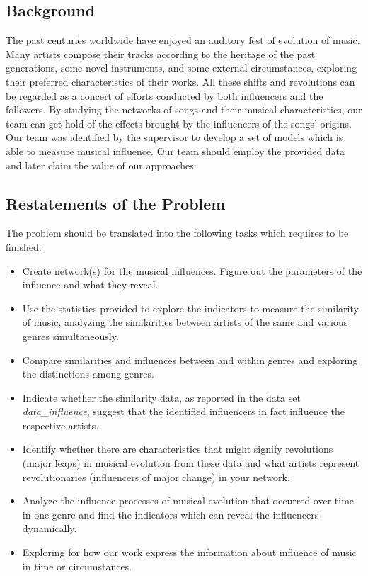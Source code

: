 \documentclass[12pt]{article}
\begin{document}
\subsection{Background}
The past centuries worldwide have enjoyed an auditory fest of evolution of music. Many artists compose their tracks according to the heritage of the past generations, some novel instruments, and some external circumstances, exploring their preferred characteristics of their works. All these shifts and revolutions can be regarded as a concert of efforts conducted by both influencers and the followers. By studying the networks of songs and their musical characteristics, our team can get hold of the effects brought by the influencers of the songs' origins.\\[2ex]
Our team was identified by the supervisor to develop a set of models which is able to measure musical influence. Our team should employ the provided data and later claim the value of our approaches.
\subsection{Restatements of the Problem}
The problem should be translated into the following tasks which requires to be finished:
\begin{itemize}
	\item Create network(s) for the musical influences. Figure out the parameters of the influence and what they reveal.
	\item Use the statistics provided to explore the indicators to measure the similarity of music, analyzing the similarities between artists of the same and various genres simultaneously.
	\item Compare similarities and influences between and within genres and exploring the distinctions among genres.
	\item Indicate whether the similarity data, as reported in the data set \textit{data\_influence}, suggest that the identified influencers in fact influence the respective artists. 
	\item Identify whether there are characteristics that might signify revolutions (major leaps) in musical evolution from these data and what artists represent revolutionaries (influencers of major change) in your network.
	\item Analyze the influence processes of musical evolution that occurred over time in one genre and find the indicators which can reveal the influencers dynamically.
	\item Exploring for how our work express the information about influence of music in time or circumstances.
\end{itemize}
\clearpage
\end{document}
